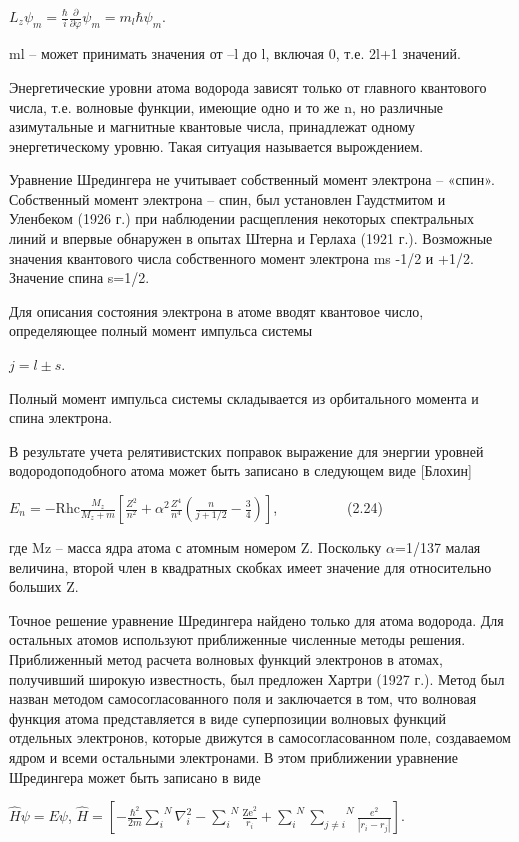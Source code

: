\documentclass[a4paper,14pt, openany, twoside, draft]{extbook} %
\begin{document}
 $L_z\psi _m=\frac{\hbar } i\frac{\partial }{\partial \varphi }\psi _m=m_l\hbar \psi _m$.

ml – может принимать значения от –l до l, включая 0, т.е. 2l+1 значений.

Энергетические уровни атома водорода зависят только от главного квантового числа, т.е. волновые функции, имеющие одно и то же n, но различные азимутальные и магнитные квантовые числа, принадлежат одному энергетическому уровню. Такая ситуация называется вырождением.

Уравнение Шредингера не учитывает собственный момент электрона – «спин». Собственный момент электрона – спин, был установлен Гаудстмитом и Уленбеком (1926 г.) при наблюдении расщепления некоторых спектральных линий и впервые обнаружен в опытах Штерна и Герлаха (1921 г.). Возможные значения квантового числа собственного момент электрона ms {}-1/2 и +1/2. Значение спина s=1/2.

Для описания состояния электрона в атоме вводят квантовое число, определяющее полный момент импульса системы

 $j=l\pm s$.

Полный момент импульса системы складывается из орбитального момента и спина электрона.

В результате учета релятивистских поправок выражение для энергии уровней водородоподобного атома может быть записано в следующем виде [Блохин]

 $E_n=-{\text{Rhc}}\frac{M_z}{M_z+m}\left[\frac{Z^2}{n^2}+\alpha ^2\frac{Z^4}{n^4}\left(\frac n{j+1/2}-\frac 3 4\right)\right]$,\ \ \ \ \ \ \ \ \ \ (2.24)

где Mz – масса ядра атома с атомным номером Z. Поскольку ${\alpha}$=1/137 малая величина, второй член в квадратных скобках имеет значение для относительно больших Z.

Точное решение уравнение Шредингера найдено только для атома водорода. Для остальных атомов используют приближенные численные методы решения. Приближенный метод расчета волновых функций электронов в атомах, получивший широкую известность, был предложен Хартри (1927 г.). Метод был назван методом самосогласованного поля и заключается в том, что волновая функция атома представляется в виде суперпозиции волновых функций отдельных электронов, которые движутся в самосогласованном поле, создаваемом ядром и всеми остальными электронами. В этом приближении уравнение Шредингера может быть записано в виде

 $\hat H\psi =\mathit{E\psi }$,   $\hat H=\left[-\frac{\hbar ^2}{2m}\overset N{\underset i{\sum }}\nabla _i^2-\overset N{\underset i{\sum }}\frac{{\text{Ze}}^2}{r_i}+\overset N{\underset i{\sum }}\overset N{\underset{j\neq i}{\sum }}\frac{e^2}{|r_i-r_j|}\right]$.
\end{document}
